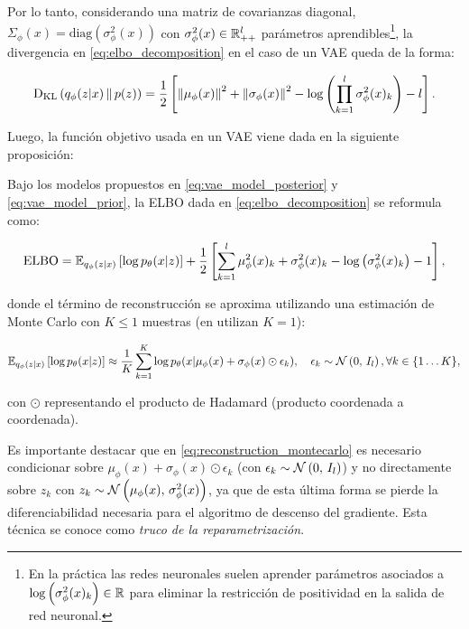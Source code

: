 Por lo tanto, considerando una matriz de covarianzas diagonal, $\Sigma_\phi(x) = \text{diag}(\sigma_\phi^2(x))$ con $\sigma_\phi^2(x)\in\mathbb{R}^l_{++}$ parámetros aprendibles\footnote{En la práctica las redes neuronales suelen aprender parámetros asociados a $\log\left(\sigma_\phi^2(x)_k\right)\in\mathbb{R}$ para eliminar la restricción de positividad en la salida de red neuronal.}, la divergencia en \eqref{eq:elbo_decomposition} en el caso de un VAE queda de la forma:

\begin{equation*}
    \operatorname{D_{KL}}\left(q_\phi(z|x)\,\|\,p(z)\right)
    = \frac{1}{2}\left[
        \left\lVert \mu_\phi(x) \right\rVert^2 + \left\lVert \sigma_\phi(x) \right\rVert^2
        - \log\left(\prod_{k=1}^l \sigma_\phi^2(x)_k\right)-l\right].
\end{equation*}

Luego, la función objetivo usada en un VAE viene dada en la siguiente proposición:

\begin{prop}
    Bajo los modelos propuestos en \eqref{eq:vae_model_posterior} y \eqref{eq:vae_model_prior}, la ELBO dada en \eqref{eq:elbo_decomposition} se reformula como:

    \begin{equation}
        \label{eq:elbo_vae}
        \operatorname{ELBO}
        = \mathbb{E}_{q_\phi(z|x)}\left[\log p_\theta(x|z)\right] + \frac{1}{2}\left[
            \sum_{k=1}^l \mu_\phi^2(x)_k + \sigma_\phi^2(x)_k
            - \log\left(\sigma_\phi^2(x)_k\right) - 1\right],
    \end{equation}

    donde el término de reconstrucción se aproxima utilizando una estimación de Monte Carlo con $K\leq 1$ muestras (en \cite{kingma2022autoencoding} utilizan $K=1$):

    \begin{equation}
        \label{eq:reconstruction_montecarlo}
        \mathbb{E}_{q_\phi(z|x)}\left[\log p_\theta(x|z)\right]
        \approx \frac{1}{K}\sum_{k=1}^K \log p_\theta(x|\mu_\phi(x)+\sigma_\phi(x)\odot\epsilon_k),
        \quad
        \epsilon_k \sim \mathcal{N}\left(0,\,I_l\right), \forall k\in\{1\ldots K\},
    \end{equation}

    con $\odot$ representando el producto de Hadamard (producto coordenada a coordenada).
\end{prop}

Es importante destacar que en \eqref{eq:reconstruction_montecarlo} es necesario condicionar sobre $\mu_\phi(x)+\sigma_\phi(x)\odot\epsilon_k$ (con $\epsilon_k\sim\mathcal{N}\left(0,\,I_l\right)$) y no directamente sobre $z_k$ con $z_k\sim \mathcal{N}\left(\mu_\phi(x),\,\sigma^2_\phi(x)\right)$, ya que de esta última forma se pierde la diferenciabilidad necesaria para el algoritmo de descenso del gradiente. Esta técnica se conoce como \textit{truco de la reparametrización}.

